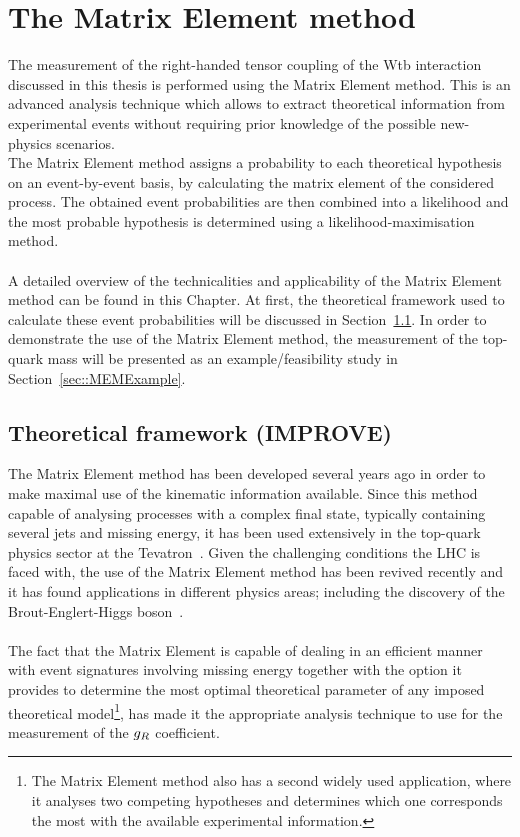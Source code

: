 \chapter{The Matrix Element method} \label{ch::MW}

The measurement of the right-handed tensor coupling of the Wtb interaction discussed in this thesis is performed using the Matrix Element method.
This is an advanced analysis technique which allows to extract theoretical information from experimental events without requiring prior knowledge of the possible new-physics scenarios.
\\
The Matrix Element method assigns a probability to each theoretical hypothesis on an event-by-event basis, by calculating the matrix element of the considered process.
The obtained event probabilities are then combined into a likelihood and the most probable hypothesis is determined using a likelihood-maximisation method.
\\
\\
A detailed overview of the technicalities and applicability of the Matrix Element method can be found in this Chapter.
At first, the theoretical framework used to calculate these event probabilities will be discussed in Section~\ref{sec::MWTheory}.
In order to demonstrate the use of the Matrix Element method, the measurement of the top-quark mass will be presented as an example/feasibility study in Section~\ref{sec::MEMExample}.

\section{Theoretical framework (IMPROVE)} \label{sec::MWTheory}

The Matrix Element method has been developed several years ago in order to make maximal use of the kinematic information available.
Since this method capable of analysing processes with a complex final state, typically containing several jets and missing energy, it has been used extensively in the top-quark physics sector at the Tevatron~\cite{MEMTevatron}.
Given the challenging conditions the LHC is faced with, the use of the Matrix Element method has been revived recently and it has found applications in different physics areas; including the discovery of the Brout-Englert-Higgs boson~\cite{HiggsMEM}.
\\
\\
The fact that the Matrix Element is capable of dealing in an efficient manner with event signatures involving missing energy together with the option it provides to determine the most optimal theoretical parameter of any imposed theoretical model\footnote{The Matrix Element method also has a second widely used application, where it analyses two competing hypotheses and determines which one corresponds the most with the available experimental information.}, has made it the appropriate analysis technique to use for the measurement of the $g_{R}$ coefficient.
\\

